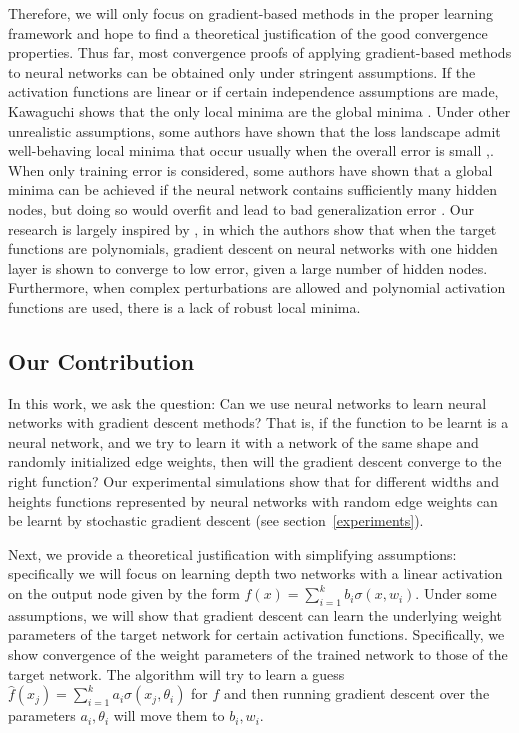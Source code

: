 \documentclass{article}
\begin{document}
Therefore, we will only focus on gradient-based methods in the proper learning framework and hope to find a theoretical justification of the good convergence properties. Thus far, most convergence proofs of applying gradient-based methods to neural networks can be obtained only under stringent assumptions. If the activation functions are linear or if certain independence assumptions are made, Kawaguchi shows that the only local minima are the global minima \cite{Kawaguchi16a}. Under other unrealistic assumptions, some authors have shown that the loss landscape admit well-behaving local minima that occur usually when the overall error is small \cite{ChoromanskaHMAL14},\cite{DauphinPGCGB14}. When only training error is considered, some authors have shown that a global minima can be achieved if the neural network contains sufficiently many hidden nodes, but doing so would overfit and lead to bad generalization error \cite{SoudryC16}. Our research is largely inspired by \cite{valiant2014learning}, in which the authors show that when the target functions are polynomials, gradient descent on neural networks with one hidden layer is shown to converge to low error, given a large number of hidden nodes. Furthermore, when complex perturbations are allowed and polynomial activation functions are used, there is a lack of robust local minima. 

\subsection{Our Contribution}

In this work, we ask the question: Can we use neural networks to learn neural networks with gradient descent methods? That is, if the function to be learnt is a neural network, and we try to learn it with a network of the same shape and randomly initialized edge weights, then will the gradient descent converge to the right function? Our experimental simulations show that for different widths and heights functions represented by neural networks with random edge weights can be learnt by stochastic gradient descent (see section~\ref{experiments}).

Next, we provide a theoretical justification with simplifying assumptions: specifically we will focus on learning depth two networks with a linear activation on the output node given by the form $f(x) = \sum_{i=1}^k b_i\sigma(x,w_i)$. Under some assumptions, we will show that gradient descent can learn the underlying weight parameters of the target network for certain activation functions. Specifically, we show convergence of the weight parameters of the trained network to those of the target network. The algorithm will try to learn a guess $\widehat{f}(x_j) = \sum_{i=1}^k a_i \sigma(x_j,\theta_i)$ for $f$ and then running gradient descent over the parameters $a_i, \theta_i$ will move them to $b_i, w_i$. 
\end{document}
